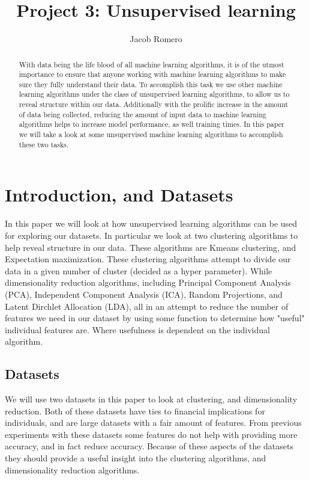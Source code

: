 \documentclass[
letterpaper, %
]{IEEEtran}
\author{Jacob Romero}
\title{Project 3: Unsupervised learning}
\begin{document}
	\maketitle
	
	\begin{abstract}
		With data being the life blood of all machine learning algorithms, it is of the utmost importance to ensure that anyone working with machine learning algorithms to make sure they fully understand their data. To accomplish this task we use other machine learning algorithms under the class of unsupervised learning algorithms, to allow us to reveal structure within our data. Additionally with the prolific increase in the amount of data being collected, reducing the amount of input data to machine learning algorithms helps to increase model performance, as well training times. In this paper we will take a look at some unsupervised machine learning algorithms to accomplish these two tasks.
	\end{abstract}
	
	\section{Introduction, and Datasets}
	In this paper we will look at how unsupervised learning algorithms can be used for exploring our datasets. In particular we look at two clustering algorithms to help reveal structure in our data. These algorithms are Kmeans clustering, and Expectation maximization. These clustering algorithms attempt to divide our data in a given number of cluster (decided as a hyper parameter). While dimensionality reduction algorithms, including Principal Component Analysis (PCA), Independent Component Analysis (ICA), Random Projections, and Latent Dirchlet Allocation (LDA), all in an attempt to reduce the number of features we need in our dataset by using some function to determine how "useful" individual features are. Where usefulness is dependent on the individual algorithm.
	
	\subsection{Datasets}
	We will use two datasets in this paper to look at clustering, and dimensionality reduction. Both of these datasets have ties to financial implications for individuals, and are large datasets with a fair amount of features. From previous experiments with these datasets some features do not help with providing more accuracy, and in fact reduce accuracy. Because of these aspects of the datasets they should provide a useful insight into the clustering algorithms, and dimensionality reduction algorithms.
	
\end{document}
